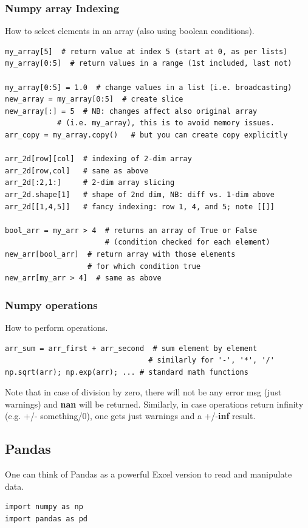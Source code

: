 \documentclass[11pt]{article}
\begin{document}
\subsubsection{Numpy array Indexing}
How to select elements in an array (also using boolean conditions).

\begin{lstlisting}
my_array[5]  # return value at index 5 (start at 0, as per lists)
my_array[0:5]  # return values in a range (1st included, last not)
 
my_array[0:5] = 1.0  # change values in a list (i.e. broadcasting)
new_array = my_array[0:5]  # create slice
new_array[:] = 5  # NB: changes affect also original array 
            # (i.e. my_array), this is to avoid memory issues.  
arr_copy = my_array.copy()   # but you can create copy explicitly 

arr_2d[row][col]  # indexing of 2-dim array
arr_2d[row,col]   # same as above
arr_2d[:2,1:]     # 2-dim array slicing
arr_2d.shape[1]   # shape of 2nd dim, NB: diff vs. 1-dim above
arr_2d[[1,4,5]]   # fancy indexing: row 1, 4, and 5; note [[]]

bool_arr = my_arr > 4  # returns an array of True or False 
                       # (condition checked for each element)
new_arr[bool_arr]  # return array with those elements 
                   # for which condition true
new_arr[my_arr > 4]  # same as above
\end{lstlisting}

\subsubsection{Numpy operations}
How to perform operations.
\begin{lstlisting}
arr_sum = arr_first + arr_second  # sum element by element
                                 # similarly for '-', '*', '/'
np.sqrt(arr); np.exp(arr); ... # standard math functions
\end{lstlisting}
Note that in case of division by zero, there will not be any error msg (just warnings) and \textbf{nan} will be returned. Similarly, in case operations return infinity (e.g. +/- something/0), one gets just warnings and a +/-\textbf{inf} result.


\subsection{Pandas}
One can think of Pandas as a powerful Excel version to read and manipulate data.
\begin{lstlisting}
import numpy as np
import pandas as pd
\end{lstlisting}
\end{document}
